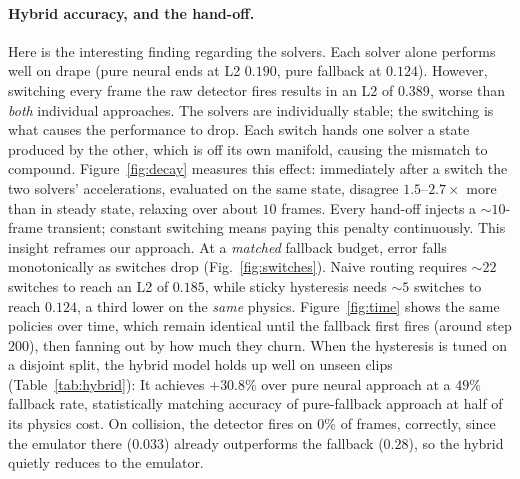 \documentclass{article}
\begin{document}
\paragraph{Hybrid accuracy, and the hand-off.}
\label{sec:hybrid}
Here is the interesting finding regarding the solvers. Each solver alone performs well on drape (pure neural ends at L2
$0.190$, pure fallback at $0.124$). However, switching every frame the raw detector fires results in an L2 of $0.389$, worse than \emph{both} individual approaches. The solvers are individually stable; the
switching is what causes the performance to drop. Each switch hands one solver a state produced by the other, which is off its own manifold, causing the mismatch to compound. Figure~\ref{fig:decay}
measures this effect: immediately after a switch the two solvers' accelerations, evaluated on the
same state, disagree $1.5$--$2.7\times$ more than in steady state, relaxing over
about $10$ frames. Every hand-off injects a $\sim$$10$-frame transient; constant switching means paying this penalty continuously. This insight reframes our approach. At a \emph{matched}
fallback budget, error falls monotonically as switches drop (Fig.~\ref{fig:switches}).
Naive routing requires $\sim$$22$ switches to reach an L2 of $0.185$, while sticky hysteresis needs
$\sim$$5$ switches to reach $0.124$, a third lower on the \emph{same} physics.
Figure~\ref{fig:time} shows the same policies over time, which remain identical until the fallback
first fires (around step $200$), then fanning out by how much they churn. When the
hysteresis is tuned on a disjoint split, the hybrid model holds up well on unseen clips
(Table~\ref{tab:hybrid}): It achieves $+30.8\%$ over pure neural approach at a $49\%$ fallback rate, statistically
matching accuracy of pure-fallback approach at half of its physics cost. On collision, the detector
fires on $0\%$ of frames, correctly, since the emulator there ($0.033$) already outperforms
the fallback ($0.28$), so the hybrid quietly reduces to the emulator.
\end{document}
